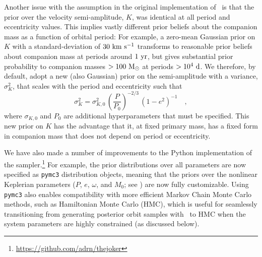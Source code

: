 \documentclass[modern]{aastex63}
\begin{document}
Another issue with the assumption in the original implementation of \thejoker\
is that the prior over the velocity semi-amplitude, $K$, was identical at all
period and eccentricity values.
This implies vastly different prior beliefs about the companion mass as a
function of orbital period: For example, a zero-mean Gaussian prior on $K$ with
a standard-deviation of $30~\mathrm{km}~\mathrm{s}^{-1}$ transforms to reasonable prior beliefs about
companion mass at periods around $1~\mathrm{yr}$, but gives substantial prior
probability to companion masses $>100~\mathrm{M}_\odot$ at periods $>10^4~\mathrm{d}$.
We therefore, by default, adopt a new (also Gaussian) prior on the
semi-amplitude with a variance, $\sigma^2_K$, that scales with the
period and eccentricity such that
\begin{equation}
    \sigma^2_K = \sigma^2_{K, 0} \, \left(\frac{P}{P_0}\right)^{-2/3} \,
        \left(1 - e^2\right)^{-1} \quad , \label{eq:sigK}
\end{equation}
where $\sigma_{K, 0}$ and $P_0$ are additional hyperparameters that must be
specified.
This new prior on $K$ has the advantage that it, at fixed primary mass, has a
fixed form in companion mass that does not depend on period or eccentricity.

We have also made a number of improvements to the Python implementation of the
sampler.\footnote{\url{https://github.com/adrn/thejoker}}
For example, the prior distributions over all parameters are now specified as
\texttt{pymc3} \citep{Salvatier2016} distribution objects, meaning that the
priors over the nonlinear Keplerian parameters ($P$, $e$, $\omega$, and $M_0$;
see \citealt{thejoker}) are now fully customizable.
Using \texttt{pymc3} also enables compatibility with more efficient Markov Chain
Monte Carlo methods, such as Hamiltonian Monte Carlo (HMC), which is useful for
seamlessly transitioning from generating posterior orbit samples with \thejoker\
to HMC when the system parameters are highly constrained (as discussed below).
\end{document}
